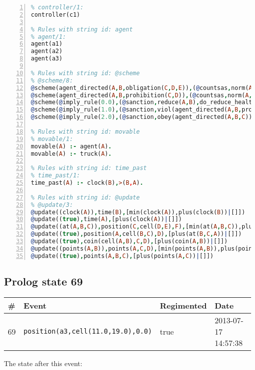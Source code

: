 \documentclass[11pt]{article}\usepackage[utf8]{inputenc}\usepackage{geometry}
\begin{document}
\begin{lstlisting}[language=Prolog, numbers=left]
% Rules with string id: controller
% controller/1:
controller(c1)

% Rules with string id: agent
% agent/1:
agent(a1)
agent(a2)
agent(a3)

% Rules with string id: @scheme
% @scheme/8:
@scheme(agent_directed(A,B,obligation(C,D,E)),(@countsas,norm(A,B,F,obligation(C,D,E)),F),false,(listTrue(C)),(time_past(D)),false,[plus(viol(agent_directed(A,B,obligation(C,D,E))))|[]],[plus(obey(agent_directed(A,B,obligation(C,D,E))))|[]])
@scheme(agent_directed(A,B,prohibition(C,D)),(@countsas,norm(A,B,E,prohibition(C,D)),E),(listTrue(C)),false,(false),false,[plus(viol(agent_directed(A,B,prohibition(C,D))))|[]],[plus(obey(agent_directed(A,B,prohibition(C,D))))|[]])
@scheme(@imply_rule(0.0),(@sanction,reduce(A,B),do_reduce_health(A,B),notifyAgent(A,changed(status))),true,false,false,false,[min(reduce(A,B))|[]],[])
@scheme(@imply_rule(1.0),(@sanction,viol(agent_directed(A,B,prohibition(C,D))),do_sanction(D)),true,false,false,false,[min(viol(agent_directed(A,B,prohibition(C,D))))|[]],[])
@scheme(@imply_rule(2.0),(@sanction,obey(agent_directed(A,B,C))),true,false,false,false,[min(obey(agent_directed(A,B,C)))|[]],[])

% Rules with string id: movable
% movable/1:
movable(A) :- agent(A).
movable(A) :- truck(A).

% Rules with string id: time_past
% time_past/1:
time_past(A) :- clock(B),>(B,A).

% Rules with string id: @update
% @update/3:
@update((clock(A)),time(B),[min(clock(A)),plus(clock(B))|[]])
@update((true),time(A),[plus(clock(A))|[]])
@update((at(A,B,C)),position(C,cell(D,E),F),[min(at(A,B,C)),plus(at(D,E,C))|[]])
@update((true),position(A,cell(B,C),D),[plus(at(B,C,A))|[]])
@update((true),coin(cell(A,B),C,D),[plus(coin(A,B))|[]])
@update((points(A,B)),points(A,C,D),[min(points(A,B)),plus(points(A,D))|[]])
@update((true),points(A,B,C),[plus(points(A,C))|[]])

\end{lstlisting}
\clearpage 
\subsection{Prolog state 69}
\begin{table}[ht]
\centering 
\begin{tabular}{l l l l} 
\textbf{\#} & \textbf{Event} & \textbf{Regimented} & \textbf{Date} \\ [0.5ex] 
\hline
69&\texttt{position(a3,cell(11.0,19.0),0.0)}&true&2013-07-17 14:57:38\\ [1ex] \hline\end{tabular}
\end{table}
The state after this event:
\end{document}
